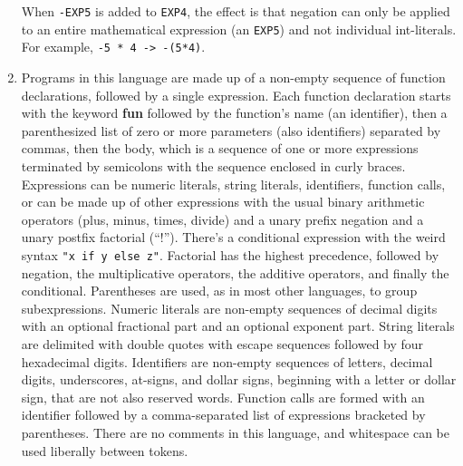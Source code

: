 \documentclass{article}
\begin{document}
\begin{enumerate}
\begin{center}

\end{center}
When \texttt{-EXP5} is added to \texttt{EXP4}, the effect is that negation can only be applied to an entire mathematical expression (an \texttt{EXP5}) and not individual int-literals. For example, \texttt{-5 * 4 -> -(5*4)}.\\
\pagebreak
\item Programs in this language are made up of a non-empty sequence of function declarations, followed by a single expression. Each function declaration starts with the keyword \textbf{fun} followed by the function's name (an identifier), then a parenthesized list of zero or more parameters (also identifiers) separated by commas, then the body, which is a sequence of one or more expressions terminated by semicolons with the sequence enclosed in curly braces. Expressions can be numeric literals, string literals, identifiers, function calls, or can be made up of other expressions with the usual binary arithmetic operators (plus, minus, times, divide) and a unary prefix negation and a unary postfix factorial (``!''). There's a conditional expression with the weird syntax \texttt{"x if y else z"}. Factorial has the highest precedence, followed by negation, the multiplicative operators, the additive operators, and finally the conditional. Parentheses are used, as in most other languages, to group subexpressions. Numeric literals are non-empty sequences of decimal digits with an optional fractional part and an optional exponent part.
String literals are delimited with double quotes with escape sequences followed by four hexadecimal digits. Identifiers are non-empty sequences of letters, decimal digits, underscores, at-signs, and dollar signs, beginning with a letter or dollar sign, that are not also reserved words. Function calls are formed with an identifier followed by a comma-separated list of expressions bracketed by parentheses. There are no comments in this language, and whitespace can be used liberally between tokens.

\end{enumerate}
\end{document}
